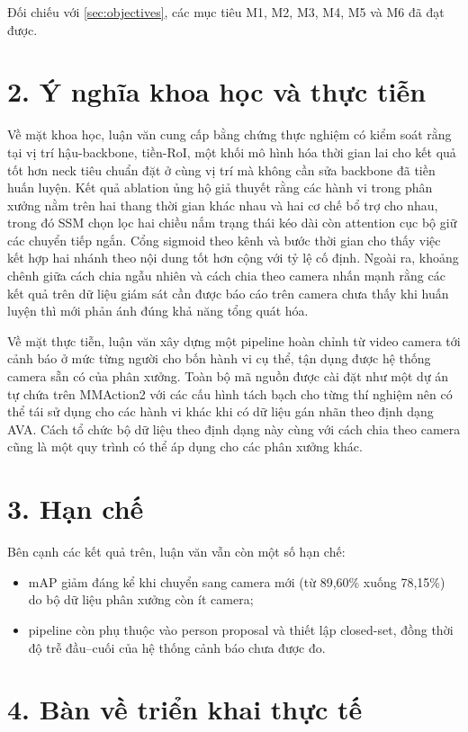 Đối chiếu với \cref{sec:objectives}, các mục tiêu M1, M2, M3, M4, M5 và M6 đã đạt được.

\section*{2. Ý nghĩa khoa học và thực tiễn}

Về mặt khoa học, luận văn cung cấp bằng chứng thực nghiệm có kiểm soát rằng tại vị trí hậu-backbone, tiền-RoI, một khối mô hình hóa thời gian lai cho kết quả tốt hơn neck tiêu chuẩn đặt ở cùng vị trí mà không cần sửa backbone đã tiền huấn luyện. Kết quả ablation ủng hộ giả thuyết rằng các hành vi trong phân xưởng nằm trên hai thang thời gian khác nhau và hai cơ chế bổ trợ cho nhau, trong đó SSM chọn lọc hai chiều nắm trạng thái kéo dài còn attention cục bộ giữ các chuyển tiếp ngắn. Cổng sigmoid theo kênh và bước thời gian cho thấy việc kết hợp hai nhánh theo nội dung tốt hơn cộng với tỷ lệ cố định. Ngoài ra, khoảng chênh giữa cách chia ngẫu nhiên và cách chia theo camera nhấn mạnh rằng các kết quả trên dữ liệu giám sát cần được báo cáo trên camera chưa thấy khi huấn luyện thì mới phản ánh đúng khả năng tổng quát hóa.

Về mặt thực tiễn, luận văn xây dựng một pipeline hoàn chỉnh từ video camera tới cảnh báo ở mức từng người cho bốn hành vi cụ thể, tận dụng được hệ thống camera sẵn có của phân xưởng. Toàn bộ mã nguồn được cài đặt như một dự án tự chứa trên MMAction2 với các cấu hình tách bạch cho từng thí nghiệm nên có thể tái sử dụng cho các hành vi khác khi có dữ liệu gán nhãn theo định dạng AVA. Cách tổ chức bộ dữ liệu theo định dạng này cùng với cách chia theo camera cũng là một quy trình có thể áp dụng cho các phân xưởng khác.

\section*{3. Hạn chế}

Bên cạnh các kết quả trên, luận văn vẫn còn một số hạn chế:
\begin{itemize}
  \item mAP giảm đáng kể khi chuyển sang camera mới (từ 89,60\% xuống 78,15\%) do bộ dữ liệu phân xưởng còn ít camera;
  \item pipeline còn phụ thuộc vào person proposal và thiết lập closed-set, đồng thời độ trễ đầu--cuối của hệ thống cảnh báo chưa được đo.
\end{itemize}

\section*{4. Bàn về triển khai thực tế}

